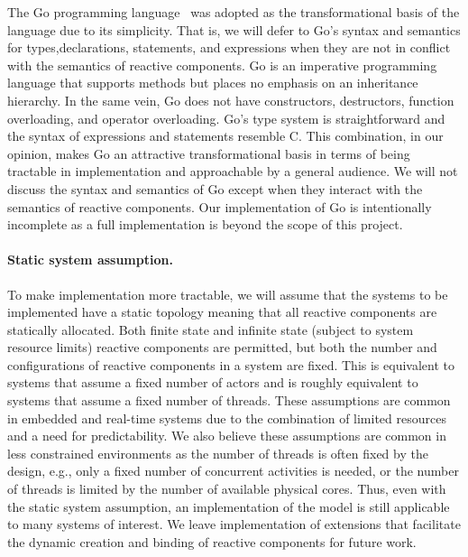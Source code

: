 The Go programming language~\cite{go} was adopted as the transformational basis of the language due to its simplicity.
That is, we will defer to Go's syntax and semantics for types,declarations, statements, and expressions when they are not in conflict with the semantics of reactive components.
Go is an imperative programming language that supports methods but places no emphasis on an inheritance hierarchy.
In the same vein, Go does not have constructors, destructors, function overloading, and operator overloading.
Go's type system is straightforward and the syntax of expressions and statements resemble C.
This combination, in our opinion, makes Go an attractive transformational basis in terms of being tractable in implementation and approachable by a general audience.
We will not discuss the syntax and semantics of Go except when they interact with the semantics of reactive components.
Our implementation of Go is intentionally incomplete as a full implementation is beyond the scope of this project.

\paragraph{Static system assumption.}
To make implementation more tractable, we will assume that the systems to be implemented have a static topology meaning that all reactive components are statically allocated.
Both finite state and infinite state (subject to system resource limits) reactive components are permitted, but both the number and configurations of reactive components in a system are fixed.
This is equivalent to systems that assume a fixed number of actors and is roughly equivalent to systems that assume a fixed number of threads.
These assumptions are common in embedded and real-time systems due to the combination of limited resources and a need for predictability.
We also believe these assumptions are common in less constrained environments as the number of threads is often fixed by the design, e.g., only a fixed number of concurrent activities is needed, or the number of threads is limited by the number of available physical cores.
Thus, even with the static system assumption, an implementation of the model is still applicable to many systems of interest.
We leave implementation of extensions that facilitate the dynamic creation and binding of reactive components for future work.

